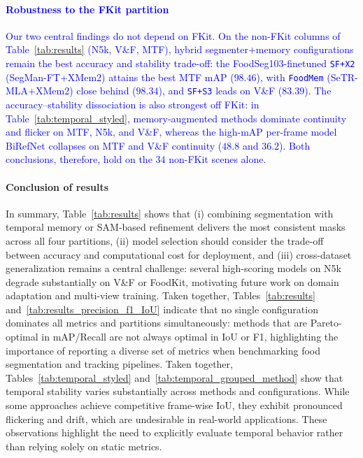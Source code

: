 \documentclass[preprint,12pt]{elsarticle}
\newcommand{\change}[1]{\textcolor{blue}{#1}}
\begin{document}
\change{\paragraph{Robustness to the FKit partition} Our two central findings do not depend on FKit. On the non-FKit columns of Table~\ref{tab:results} (N5k, V\&F, MTF), hybrid segmenter+memory configurations remain the best accuracy and stability trade-off: the FoodSeg103-finetuned \texttt{SF+X2} (SegMan-FT+XMem2) attains the best MTF mAP ($98.46$), with \texttt{FoodMem} (SeTR-MLA+XMem2) close behind ($98.34$), and \texttt{SF+S3} leads on V\&F ($83.39$). The accuracy--stability dissociation is also strongest off FKit: in Table~\ref{tab:temporal_styled}, memory-augmented methods dominate continuity and flicker on MTF, N5k, and V\&F, whereas the high-mAP per-frame model BiRefNet collapses on MTF and V\&F continuity ($48.8$ and $36.2$). Both conclusions, therefore, hold on the $34$ non-FKit scenes alone.}

\paragraph{Conclusion of results} In summary, Table~\ref{tab:results} shows that (i) combining segmentation with temporal memory or SAM-based refinement delivers the most consistent masks across all four partitions, (ii) model selection should consider the trade-off between accuracy and computational cost for deployment, and (iii) cross-dataset generalization remains a central challenge: several high-scoring models on N5k degrade substantially on V\&F or FoodKit, motivating future work on domain adaptation and multi-view training.
Taken together, Tables~\ref{tab:results} and~\ref{tab:results_precision_f1_IoU} indicate that no single configuration dominates all metrics and partitions simultaneously: methods that are Pareto-optimal in $\mathrm{mAP}$/Recall are not always optimal in IoU or F1, highlighting the importance of reporting a diverse set of metrics when benchmarking food segmentation and tracking pipelines. 
Taken together, Tables~\ref{tab:temporal_styled} and~\ref{tab:temporal_grouped_method} show that temporal stability varies substantially across methods and configurations. While some approaches achieve competitive frame-wise IoU, they exhibit pronounced flickering and drift, which are undesirable in real-world applications. These observations highlight the need to explicitly evaluate temporal behavior rather than relying solely on static metrics.
\end{document}
